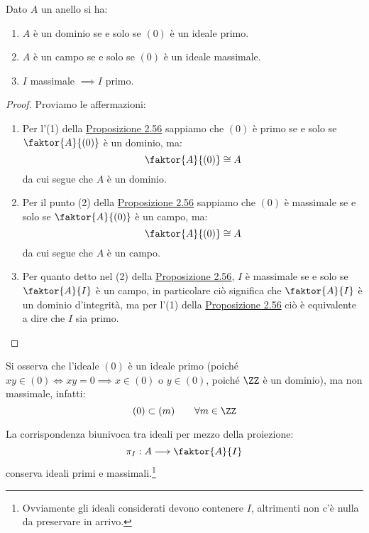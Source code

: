 \documentclass[11pt]{scrartcl}
\begin{document}
\begin{corollary}
    \label{2.57}
    Dato $A$ un anello si ha:
    \begin{enumerate}[(1)]
        \item $A$ è un dominio se e solo se $(0)$ è un ideale primo.
        \item $A$ è un campo se e solo se $(0)$ è un ideale massimale.
        \item $I$ massimale $\implies I$ primo.
    \end{enumerate}
\end{corollary}

\begin{proof}
    Proviamo le affermazioni:
    \begin{enumerate}[(1)]
        \item Per l'(1) della \hyperref[2.56]{Proposizione 2.56} sappiamo che $(0)$ è primo se e solo se $\faktor{A}{(0)}$ è un dominio, ma:
            \[ \faktor{A}{(0)} \cong A
                \]
            da cui segue che $A$ è un dominio.
        \item Per il punto (2) della \hyperref[2.56]{Proposizione 2.56} sappiamo che $(0)$ è massimale se e solo se $\faktor{A}{(0)}$ è un campo, ma:
            \[ \faktor{A}{(0)} \cong A
                \]
            da cui segue che $A$ è un campo.
        \item Per quanto detto nel (2) della \hyperref[2.56]{Proposizione 2.56}, $I$ è massimale se e solo se $\faktor{A}{I}$ è un campo, in particolare ciò 
            significa che $\faktor{A}{I}$ è un dominio d'integrità, ma per l'(1) della \hyperref[2.56]{Proposizione 2.56} ciò è equivalente a dire che $I$ sia primo.
    \end{enumerate}
\end{proof}

\begin{example}
    Si osserva che l'ideale $(0)$ è un ideale primo (poiché $xy \in (0) \iff xy = 0 \implies x \in (0)$ o $y \in (0)$, poiché $\ZZ$ è un dominio), ma non massimale, infatti:
        \[ (0) \subset (m) \qquad \forall m \in \ZZ
            \]
\end{example}

\begin{corollary}
    La corrispondenza biunivoca tra ideali per mezzo della proiezione:
    \[ \pi_I : A \longrightarrow \faktor{A}{I}
        \]
    conserva ideali primi e massimali.\footnote{Ovviamente gli ideali considerati devono contenere $I$, altrimenti non c'è nulla da preservare in arrivo.}
\end{corollary}
\end{document}
